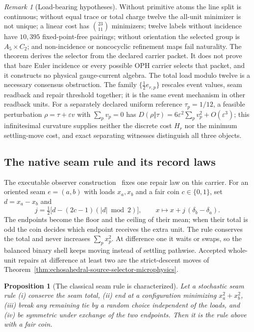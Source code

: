 \documentclass[11pt]{article}
\newtheorem{proposition}[theorem]{Proposition}
\theoremstyle{remark}
\newtheorem{remark}[theorem]{Remark}
\theoremstyle{plain}
\begin{document}
\begin{remark}[Load-bearing hypotheses]
Without primitive atoms the line split is continuous; without equal trace or
total charge twelve the all-unit minimizer is not unique; a linear cost has
\(\binom{23}{11}\) minimizers; twelve labels without incidence have
\(10{,}395\) fixed-point-free pairings; without orientation the selected group
is \(A_5\times C_2\); and non-incidence or noncocyclic refinement maps fail
naturality. The theorem derives the selector from the declared carrier
packet. It does not prove that bare Euler incidence or every possible OPH
carrier selects that packet, and it constructs no physical gauge-current
algebra. The total load modulo twelve is a necessary consensus obstruction.
The family \(\{\tfrac12 e_{r,p}\}\) rescales event values, seam readback and
repair threshold together; it is the same event mechanism in other readback
units. For a separately declared uniform reference \(\tau_p=1/12\), a
feasible perturbation \(\rho=\tau+\varepsilon v\) with \(\sum_pv_p=0\) has
\(D(\rho\Vert\tau)=6\varepsilon^2\sum_pv_p^2+O(\varepsilon^3)\); this
infinitesimal curvature supplies neither the discrete cost \(H_r\) nor the
minimum settling-move cost, and exact separating witnesses distinguish all
three objects.
\end{remark}

\subsection{The native seam rule and its record laws}
\label{subsec:native-seam-rule}

The executable observer construction~\cite{ophmodel} fixes one repair law on
this carrier. For an oriented seam \(e=(a,b)\) with loads \(x_a,x_b\) and a
fair coin \(c\in\{0,1\}\), set \(d=x_a-x_b\) and
\[
j=\tfrac12\bigl[d-(2c-1)(|d|\bmod2)\bigr],\qquad
x\longmapsto x+j\,(\delta_b-\delta_a).
\]
The endpoints become the floor and the ceiling of their mean; when their
total is odd the coin decides which endpoint receives the extra unit. The
rule conserves the total and never increases \(\sum_px_p^2\). At difference
one it waits or swaps, so the balanced binary shell keeps moving instead of
settling pathwise. Accepted whole-unit repairs at difference at least two
are the strict-descent moves of
Theorem~\ref{thm:echosahedral-source-selector-microphysics}.

\begin{proposition}[The classical seam rule is characterized]
\label{prop:classical-seam-rule}
Let a stochastic seam rule (i) conserve the seam total, (ii) end at a
configuration minimizing \(x_a^2+x_b^2\), (iii) break any remaining tie by a
random choice independent of the loads, and (iv) be symmetric under exchange
of the two endpoints. Then it is the rule above with a fair coin.
\end{proposition}
\end{document}
